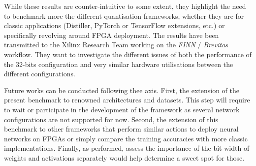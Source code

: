 While these results are counter-intuitive to some extent, they highlight the need to benchmark more the different quantisation frameworks, whether they are for classic applications (Distiller, PyTorch or TensorFlow extensions, etc.) or specifically revolving around FPGA deployment. The results have been transmitted to the Xilinx Research Team working on the \emph{FINN} / \emph{Brevitas} workflow. They want to investigate the different issues of both the performance of the 32-bits configuration and very similar hardware utilisations between the different configurations.

Future works can be conducted following thee axis. First, the extension of the present benchmark to renowned architectures and datasets. This step will require to wait or participate in the development of the framework as several network configurations are not supported for now. Second, the extension of this benchmark to other frameworks that perform similar actions to deploy neural networks on FPGAs or simply compare the training accuracies with more classic implementations. Finally, as \cite{Bacchus2020} performed, assess the importance of the bit-width of weights and activations separately would help determine a sweet spot for those.
